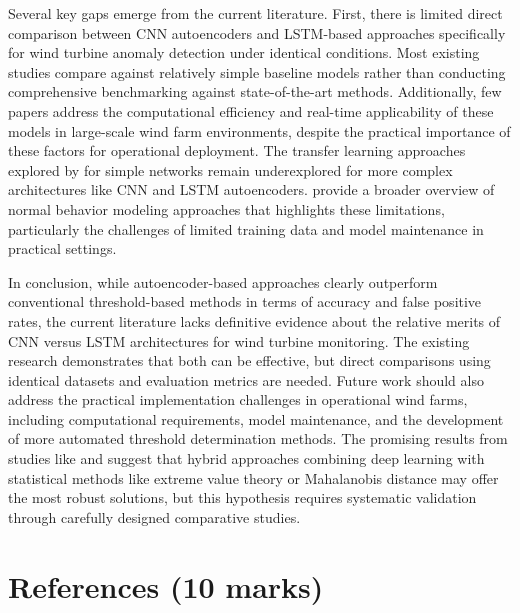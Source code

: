 \documentclass[a4paper,12pt]{article}
\begin{document}
Several key gaps emerge from the current literature. First, there is limited direct comparison between CNN autoencoders and LSTM-based approaches specifically for wind turbine anomaly detection under identical conditions. Most existing studies compare against relatively simple baseline models rather than conducting comprehensive benchmarking against state-of-the-art methods. Additionally, few papers address the computational efficiency and real-time applicability of these models in large-scale wind farm environments, despite the practical importance of these factors for operational deployment. The transfer learning approaches explored by \citeauthor{roelofs_transfer_2024} for simple networks remain underexplored for more complex architectures like CNN and LSTM autoencoders. \citeauthor{chesterman_overview_2023} provide a broader overview of normal behavior modeling approaches that highlights these limitations, particularly the challenges of limited training data and model maintenance in practical settings.

In conclusion, while autoencoder-based approaches clearly outperform conventional threshold-based methods in terms of accuracy and false positive rates, the current literature lacks definitive evidence about the relative merits of CNN versus LSTM architectures for wind turbine monitoring. The existing research demonstrates that both can be effective, but direct comparisons using identical datasets and evaluation metrics are needed. Future work should also address the practical implementation challenges in operational wind farms, including computational requirements, model maintenance, and the development of more automated threshold determination methods. The promising results from studies like \citeauthor{zhao_anomaly_2018} and \citeauthor{ahmad_autoencoder-based_2020} suggest that hybrid approaches combining deep learning with statistical methods like extreme value theory or Mahalanobis distance may offer the most robust solutions, but this hypothesis requires systematic validation through carefully designed comparative studies.


\section{References (10 marks)}



\end{document}
